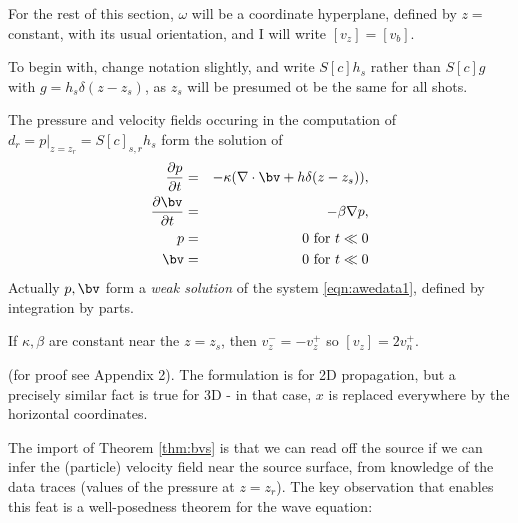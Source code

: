 For the rest of this section, $\omega$ will be a coordinate hyperplane, defined by $z=$ constant, with its usual orientation, and I will write $[v_z] = [v_b]$.

To begin with, change notation slightly, and write $S[c]h_s$ rather than $S[c]g$ with $g = h_s \delta(z-z_s)$, as $z_s$ will be presumed ot be the same for all shots. 

The pressure and velocity fields occuring in the computation of $d_r=p|_{z=z_r}=S[c]_{s,r}h_s$ form the solution of
\begin{eqnarray}
\label{eqn:awedata1}
\frac{\partial p}{\partial t} & = & - \kappa( \nabla \cdot \bv +
h \delta(z-z_s)), \nonumber \\
\frac{\partial \bv}{\partial t} & = & - \beta \nabla p,\nonumber \\
p & =& 0 \mbox{ for } t \ll 0 \nonumber\\ 
\bv & = & 0 \mbox{ for } t \ll 0 \nonumber\\
\end{eqnarray}
Actually $p,\bv$ form a {\em weak solution} of the system \ref{eqn:awedata1}, defined by integration by parts.
\begin{thm}
\label{thm:vz2}
If $\kappa,\beta$ are constant near the $z=z_s$, then $v_z^-=-v_z^+$ so $[v_z] = 2 v_n^+$. 
\end{thm}
(for proof see Appendix 2). The formulation is for 2D propagation, but a precisely similar fact is true for 3D - in that case, $x$ is replaced everywhere by the horizontal coordinates.

The import of Theorem \ref{thm:bvs} is that we can read off the source if we can infer the (particle) velocity field near the source surface, from knowledge of the data traces (values of the pressure at $z=z_r$). The key observation that enables this feat is a well-posedness theorem for the wave equation:


